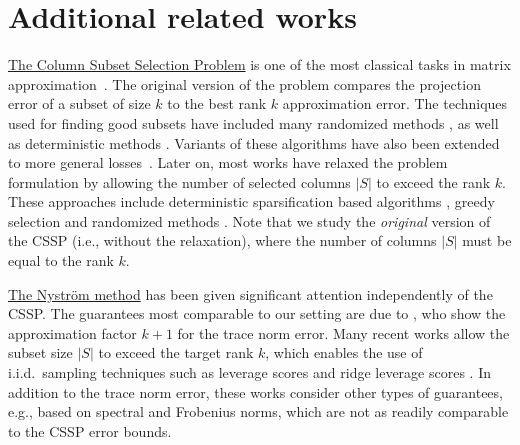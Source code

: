 \documentclass{article}
\begin{document}
\section{Additional related works}
\label{s:related-work}
\underline{The Column Subset Selection Problem} is one of the most classical tasks
in matrix approximation~\citep{BoutsidisMD08}. The original version of the problem compares the
projection error of a subset of size $k$ to the best rank $k$
approximation error. The techniques used for finding good subsets have
included many randomized methods
\citep{pca-volume-sampling,BoutsidisMD08,dpp-for-cssp,boutsidis2014optimal}, as well as deterministic
methods \citep{GuE96}. Variants of these algorithms have also been extended to more general losses~\citep{chierichetti17algorithms, khanna2017scalable, elenberg2016restricted}. Later on, most works have relaxed the problem
formulation by allowing the number of selected columns $|S|$ to exceed
the rank $k$. These approaches include deterministic sparsification
based algorithms \citep{near-optimal-columns}, greedy selection
\citep[e.g.,][]{Bhaskara2016GreedyCSS} and randomized methods
\citep[e.g.,][]{Drineas08CUR,more-efficient-volume-sampling,Paul2015CSS}. Note that
we study the \emph{original} version of the CSSP (i.e., without the
relaxation), where the number of columns $|S|$ must be equal to the
rank $k$. 

\underline{The Nystr\"om method} has been given significant attention
independently of the CSSP. The guarantees most comparable to our
setting are due to \citet{belabbas-wolfe09}, who show the approximation
factor $k+1$ for the trace norm error. Many recent works allow the subset size $|S|$ to exceed
the target rank $k$, which enables the use of i.i.d.~sampling
techniques such as leverage scores \citep{revisiting-nystrom}
and ridge leverage scores \citep{ridge-leverage-scores,Musco17Nystrom}.
In addition to the trace norm error, these works consider other types
of guarantees, e.g., based on spectral and Frobenius norms, which are not 
as readily comparable to the CSSP error bounds.
\end{document}

